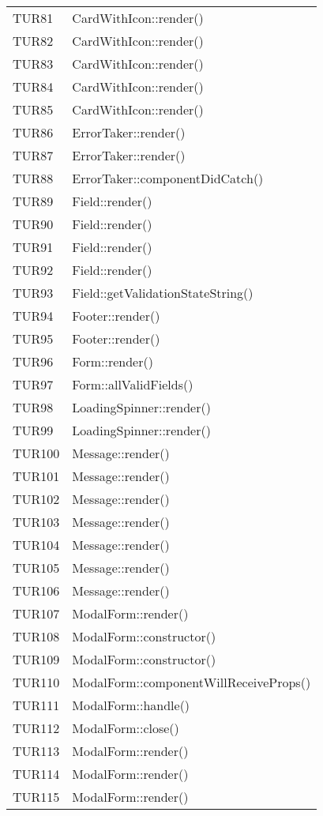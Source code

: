 \documentclass[PianoDiQualifica.tex]{subfiles}
\begin{document}
\begin{longtable}[H]{P{5cm}P{9cm}}
	TUR81 & CardWithIcon::render() \\ 
	TUR82 & CardWithIcon::render() \\ 
	TUR83 & CardWithIcon::render() \\ 
	TUR84 & CardWithIcon::render() \\ 
	TUR85 & CardWithIcon::render() \\ 
	TUR86 & ErrorTaker::render() \\ 
	TUR87 & ErrorTaker::render() \\ 
	TUR88 & ErrorTaker::componentDidCatch() \\ 
	TUR89 & Field::render() \\ 
	TUR90 & Field::render() \\ 
	TUR91 & Field::render() \\ 
	TUR92 & Field::render() \\ 
	TUR93 & Field::getValidationStateString() \\ 
	TUR94 & Footer::render() \\ 
	TUR95 & Footer::render() \\ 
	TUR96 & Form::render() \\ 
	TUR97 & Form::allValidFields() \\ 
	TUR98 & LoadingSpinner::render() \\ 
	TUR99 & LoadingSpinner::render() \\ 
	TUR100 & Message::render() \\ 
	TUR101 & Message::render() \\ 
	TUR102 & Message::render() \\ 
	TUR103 & Message::render() \\ 
	TUR104 & Message::render() \\ 
	TUR105 & Message::render() \\ 
	TUR106 & Message::render() \\ 
	TUR107 & ModalForm::render() \\ 
	TUR108 & ModalForm::constructor() \\ 
	TUR109 & ModalForm::constructor() \\ 
	TUR110 & ModalForm::componentWillReceiveProps() \\ 
	TUR111 & ModalForm::handle() \\ 
	TUR112 & ModalForm::close() \\ 
	TUR113 & ModalForm::render() \\ 
	TUR114 & ModalForm::render() \\ 
	TUR115 & ModalForm::render() \\ 

\end{longtable}
\end{document}
